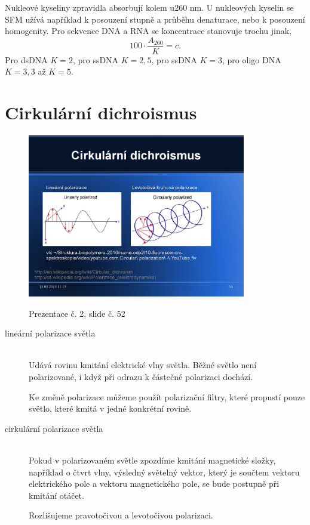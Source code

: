 \documentclass[DIV=8]{scrreprt}
\begin{document}
Nukleové kyseliny zpravidla absorbují kolem u{260 nm}. U nukleových kyselin se SFM užívá například k posouzení stupně a průběhu denaturace, nebo k posouzení homogenity. Pro sekvence DNA a RNA se koncentrace stanovuje trochu jinak,
\[100 \cdot \frac{A_{260}}{K} = c.\]
Pro dsDNA \(K = 2\), pro ssDNA \(K = 2,5\), pro ssDNA \(K = 3\), pro oligo DNA \(K = 3,3\) až \(K = 5\).

\section{Cirkulární dichroismus} \label{Cirkulární dichroismus} \FloatBarrier


\begin{figure}
    \caption{Prezentace č. 2, slide č. 52}
    \includegraphics[width=0.85\textwidth]{slides-2/slide-52.jpg}
    \centering
    \label{slides-2-slide-52}
\end{figure}

\begin{description}
\item[lineární polarizace světla]\hfill \\
Udává rovinu kmitání elektrické vlny světla. Běžné světlo není polarizované, i když při odrazu k částečné polarizaci dochází.

Ke změně polarizace můžeme použít polarizační filtry, které propustí pouze světlo, které kmitá v jedné konkrétní rovině.


\item[cirkulární polarizace světla]\hfill \\
Pokud v polarizovaném světle zpozdíme kmitání magnetické složky, například o čtvrt vlny, výsledný světelný vektor, který je součtem vektoru elektrického pole a vektoru magnetického pole, se bude postupně při kmitání otáčet.

Rozlišujeme pravotočivou a levotočivou polarizaci.

\end{description}
\end{document}
